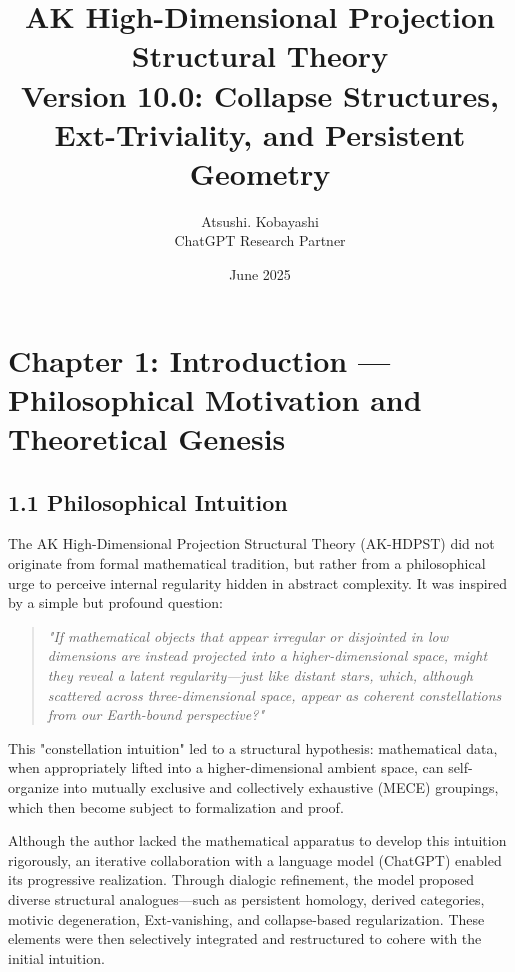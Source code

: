 \documentclass[11pt]{article}
\title{AK High-Dimensional Projection Structural Theory\\
\Large Version 10.0: Collapse Structures, Ext-Triviality, and Persistent Geometry}
\author{Atsushi. Kobayashi \\ \small ChatGPT Research Partner}
\date{June 2025}
\begin{document}
\maketitle

\tableofcontents
\newpage



\section{Chapter 1: Introduction — Philosophical Motivation and Theoretical Genesis}

\subsection*{1.1 Philosophical Intuition}

The AK High-Dimensional Projection Structural Theory (AK-HDPST) did not originate from formal mathematical tradition,  
but rather from a philosophical urge to perceive internal regularity hidden in abstract complexity.  
It was inspired by a simple but profound question:

\begin{quote}
\textit{
"If mathematical objects that appear irregular or disjointed in low dimensions  
are instead projected into a higher-dimensional space,  
might they reveal a latent regularity—just like distant stars,  
which, although scattered across three-dimensional space,  
appear as coherent constellations from our Earth-bound perspective?"  
}
\end{quote}

This "constellation intuition" led to a structural hypothesis:  
mathematical data, when appropriately lifted into a higher-dimensional ambient space,  
can self-organize into mutually exclusive and collectively exhaustive (MECE) groupings,  
which then become subject to formalization and proof.

Although the author lacked the mathematical apparatus to develop this intuition rigorously,  
an iterative collaboration with a language model (ChatGPT) enabled its progressive realization.  
Through dialogic refinement, the model proposed diverse structural analogues—such as persistent homology,  
derived categories, motivic degeneration, Ext-vanishing, and collapse-based regularization.  
These elements were then selectively integrated and restructured to cohere with the initial intuition.
\end{document}
